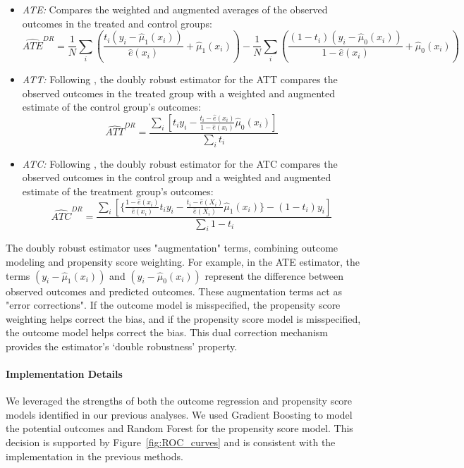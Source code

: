 \documentclass{article}
\begin{document}
\begin{itemize}
    \item \textit{ATE:} Compares the weighted and augmented averages of the observed outcomes in the treated and control groups:
    \[
    \widehat{ATE}^{DR} = \frac{1}{N} \sum_i \left( \frac{t_i (y_i - \hat{\mu}_1(x_i))}{\hat{e}(x_i)} + \hat{\mu}_1(x_i) \right) - \frac{1}{N} \sum_i \left( \frac{(1 - t_i)(y_i - \hat{\mu}_0(x_i))}{1 - \hat{e}(x_i)} + \hat{\mu}_0(x_i) \right)
    \]
    
    \item \textit{ATT:} Following \citet{tao2019doubly}, the doubly robust estimator for the ATT compares the observed outcomes in the treated group with a weighted and augmented estimate of the control group's outcomes: 
    \[
    \widehat{ATT}^{DR} = \frac{\sum_i \left[ t_i y_i - \frac{ t_i - \hat{e}(x_i)}{1 - \hat{e}(x_i)} \hat{\mu}_0(x_i) \right]}{\sum_i t_i}
    \]
    
    \item \textit{ATC:} Following \citet{tao2019doubly}, the doubly robust estimator for the ATC compares the observed outcomes in the control group and a weighted and augmented estimate of the treatment group's outcomes:
    \[
    \widehat{ATC}^{DR} = \frac{\sum_i \left[ \{ \frac{ 1 - \hat{e}(x_i)}{\hat{e}(x_i)} t_i y_i - \frac{ t_i - \hat{e}(X_i)}{\hat{e}(X_i)} \hat{\mu}_1(x_i) \}   - (1-t_i)y_i \right]}{\sum_i 1 - t_i}
    \]
\end{itemize}

The doubly robust estimator uses "augmentation" terms, combining outcome modeling and propensity score weighting. For example, in the ATE estimator, the terms $(y_i - \hat{\mu}_1(x_i))$ and $(y_i - \hat{\mu}_0(x_i))$ represent the difference between observed outcomes and predicted outcomes. These augmentation terms act as "error corrections". If the outcome model is misspecified, the propensity score weighting helps correct the bias, and if the propensity score model is misspecified, the outcome model helps correct the bias. This dual correction mechanism provides the estimator's `double robustness' property.

\paragraph{Implementation Details} We leveraged the strengths of both the outcome regression and propensity score models identified in our previous analyses. We used Gradient Boosting to model the potential outcomes and Random Forest for the propensity score model. This decision is supported by Figure~\ref{fig:ROC_curves} and is consistent with the implementation in the previous methods.
\end{document}
